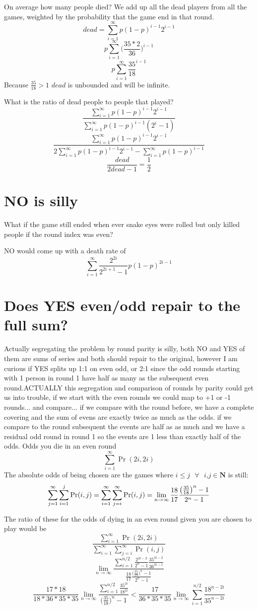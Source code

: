 \documentclass[12pt, letterpaper]{article}
\begin{document}
On average how many people died?
We add up all the dead players from all the games, weighted by the probability that the game end in that round.
$$dead=\sum_{i=1}^\infty p(1-p)^{i-1}2^{i-1}$$
$$p\sum_{i=1}^\infty \bigg(\frac{35*2}{36}\bigg)^{i-1}$$
$$p\sum_{i=1}^\infty \frac{35}{18}^{i-1}$$
Because $\frac{35}{18}>1$ $dead$ is unbounded and will be infinite.

What is the ratio of dead people to people that played?
$$\frac{\sum_{i=1}^\infty p(1-p)^{i-1}2^{i-1}}{\sum_{i=1}^\infty p(1-p)^{i-1}(2^i-1)}$$
$$\frac{\sum_{i=1}^\infty p(1-p)^{i-1}2^{i-1}}{2\sum_{i=1}^\infty p(1-p)^{i-1}2^{i-1}-\sum_{i=1}^\infty p(1-p)^{i-1}}$$
$$\frac{dead}{2dead-1} = \frac{1}{2}$$

\section{NO is silly}
What if the game still ended when ever snake eyes were rolled but only killed people if the round index was even?

NO would come up with a death rate of
$$\sum_{i=1}^\infty \frac{2^{2i}}{2^{2i+1}-1}p(1-p)^{2i-1}$$

\section{Does YES even/odd repair to the full sum?}
Actually segregating the problem by round parity is silly, both NO and YES of them are sums of series and both should repair to the original, however I am curious if YES splits up 1:1 on even odd, or 2:1 since the odd rounds starting with 1 person in round 1 have half as many as the subsequent even round.ACTUALLY this segregation and comparison of rounds by parity could get us into trouble,  if we start with the even rounds we could map to +1 or -1 rounds... and compare... if we compare with the round before, we have a complete covering and the sum of evens are exactly twice as much as the odds.  if we compare to the round subsequent the events are half as as much and we have a residual odd round in round 1 so the events are 1 less than exactly half of the odds.
Odds you die in an even round
$$\sum_{i=1}^\infty \Pr(2i,2i)$$
The absolute odds of being chosen are the games where  $i\leq j \text{ }\forall \text{ } i\text{,}j \in \mathbf{N}$ is still:
\begin{equation}
   \sum_{j=1}^{\infty} \sum_{i=1}^{j} \Pr(i,j) = \sum_{i=1}^{\infty} \sum_{j=i}^{\infty} \Pr(i,j)\\
   = \lim_{n\to\infty}\frac{18}{17}\frac{\big(\frac{35}{18}\big)^n-1}{2^n-1}
\end{equation}

The ratio of these for the odds of dying in an even round given you are chosen to play would be
$$\frac{\sum_{i=1}^\infty\Pr(2i,2i)}{\sum_{i=1}^{\infty} \sum_{j=i}^{\infty} \Pr(i,j)}$$
$$\lim_{n\to\infty}\frac{\sum_{i=1}^{n/2} \frac{2^{2i-2}}{2^n-1}\frac{35^{2i-2}}{36^{2i-1}}}{\frac{18}{17}\frac{\big(\frac{35}{18}\big)^n-1}{2^n-1}}$$
$$\frac{17*18}{18*36*35*35}\lim_{n\to\infty}\frac{\sum_{i=1}^{n/2} \frac{35^{2i}}{18^{2i}}}{\big(\frac{35}{18}\big)^n-1}<\frac{17}{36*35*35}\lim_{n\to\infty}\sum_{i=1}^{n/2} \frac{18^{n-2i}}{35^{n-2i}}$$
\end{document}
